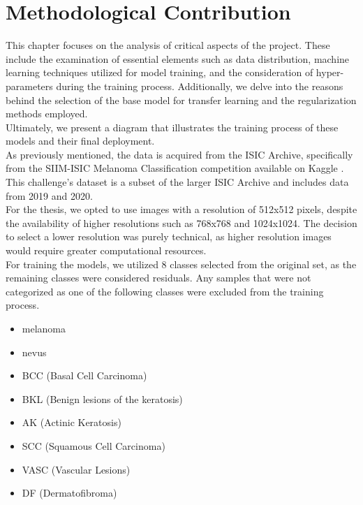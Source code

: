 \chapter{Methodological Contribution} \label{cap:contrib}


This chapter focuses on the analysis of critical aspects of the project. These
include the examination of essential elements such as data distribution,
machine learning techniques utilized for model training, and the consideration
of hyper-parameters during the training process. Additionally, we delve into
the reasons behind the selection of the base model for transfer learning and
the regularization methods employed. \\

Ultimately, we present a diagram that illustrates the training process of these
models and their final deployment. \\

As previously mentioned, the data is acquired from the ISIC Archive,
specifically from the SIIM-ISIC Melanoma Classification competition available
on Kaggle \cite{ISICKaggle}. This challenge's dataset is a subset of the larger
ISIC Archive and includes data from 2019 and 2020. \\

For the thesis, we opted to use images with a resolution of 512x512 pixels,
despite the availability of higher resolutions such as 768x768 and 1024x1024.
The decision to select a lower resolution was purely technical, as higher
resolution images would require greater computational resources. \\

For training the models, we utilized 8 classes selected from the original set,
as the remaining classes were considered residuals. Any samples that were not
categorized as one of the following classes were excluded from the training
process.

\begin{itemize}
  \item melanoma
  \item nevus
  \item BCC (Basal Cell Carcinoma)
  \item BKL (Benign lesions of the keratosis)
  \item AK (Actinic Keratosis)
  \item SCC (Squamous Cell Carcinoma)
  \item VASC (Vascular Lesions)
  \item DF (Dermatofibroma)
\end{itemize}

